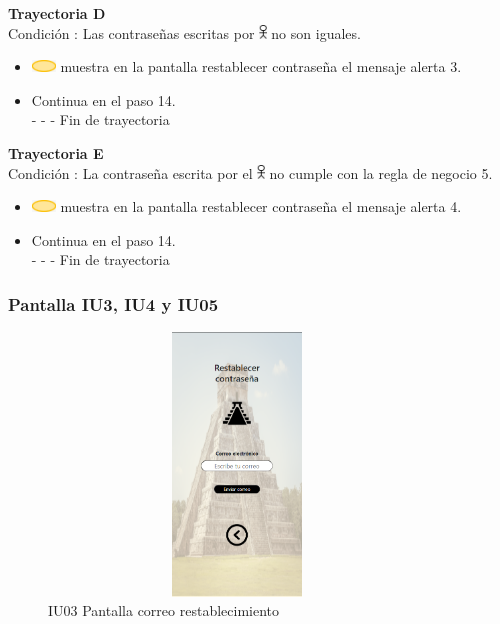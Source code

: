 \textbf{Trayectoria D}\\
Condición : Las contraseñas escritas por \includegraphics[width=0.0150\textwidth]{Figuras/persona.png} no son iguales.
\begin{itemize}
    \item  \includegraphics[width=0.0500\textwidth]{Figuras/sistema.png} muestra en la pantalla restablecer contraseña el mensaje alerta 3.
    \item Continua en el paso 14.\\
    - - - Fin de trayectoria
\end{itemize}
\textbf{Trayectoria E}\\
Condición : La contraseña escrita por el \includegraphics[width=0.0150\textwidth]{Figuras/persona.png} no cumple con la regla de negocio 5.
\begin{itemize}
    \item \includegraphics[width=0.0500\textwidth]{Figuras/sistema.png} muestra en la pantalla restablecer contraseña el mensaje alerta 4.
    \item Continua en el paso 14.\\
    - - - Fin de trayectoria
\end{itemize}
\pagebreak

\newpage
\subsubsection{Pantalla IU3, IU4 y IU05}

    \begin{figure}[htbp]
        \centering
        \includegraphics[width=10cm, height=7cm]{entregable final/pantallasSistema/IU03 Pantalla correo restablecimiento.png}
    \caption{IU03 Pantalla correo restablecimiento}
        \label{fig:enter-label}
    \end{figure}
    
